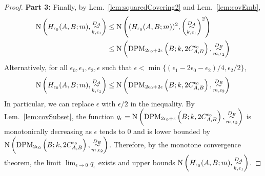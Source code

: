 \documentclass{article} %
\newcommand{\Cov}{\textnormal{N}}
\begin{document}
\begin{proof}
\textbf{Part 3:} Finally, by Lem.~\ref{lem:squaredCovering2} and Lem.~\ref{lem:covEmb}, 
\begin{equation}
\begin{aligned}
\Cov\left(H_{\epsilon_0}(A,B;m),\overset{D_A}{\underset{k,\epsilon_1}{\sim}}\right) & \leq \Cov\left((H_{\epsilon_0}(A,B;m))^2,\left(\overset{D_A}{\underset{k,\epsilon_1}{\sim}}\right)^2 \right) \\
&\leq \Cov\left (\textnormal{DPM}_{2\epsilon_0+2\epsilon}\left(B;k, 2C^{\epsilon_0}_{A,B} \right), \overset{D_B}{\underset{m,\epsilon_2}{\sim}} \right)
\end{aligned}
\end{equation}
Alternatively, for all $\epsilon_0,\epsilon_1,\epsilon_2,\epsilon$ such that $\epsilon < \min\{(\epsilon_1 - 2\epsilon_0 - \epsilon_2)/4,\epsilon_2/2\}$,
\begin{equation}
\Cov\left(H_{\epsilon_0}(A,B;m),\overset{D_A}{\underset{k,\epsilon_1}{\sim}}\right) \leq 
\Cov\left (\textnormal{DPM}_{2\epsilon_0+2\epsilon}\left(B;k, 2C^{\epsilon_0}_{A,B} \right), \overset{D_B}{\underset{m,\epsilon_2}{\sim}} \right)
\end{equation}
In particular, we can replace $\epsilon$ with $\epsilon/2$ in the inequality. By Lem.~\ref{lem:covSubset}, the function $q_\epsilon = \Cov\left (\textnormal{DPM}_{2\epsilon_0+\epsilon}\left(B;k, 2C^{\epsilon_0}_{A,B} \right), \overset{D_B}{\underset{m,\epsilon_2}{\sim}} \right)$ is monotonically decreasing as $\epsilon$ tends to $0$ and is lower bounded by $\Cov\left (\textnormal{DPM}_{2\epsilon_0}\left(B;k, 2C^{\epsilon_0}_{A,B} \right), \overset{D_B}{\underset{m,\epsilon_2}{\sim}} \right)$. Therefore, by the monotone convergence theorem, the limit $\lim_{\epsilon \to 0} q_\epsilon$ exists and upper bounds $\Cov\left(H_{\epsilon_0}(A,B;m),\overset{D_A}{\underset{k,\epsilon_1}{\sim}}\right)$.
\end{proof}


\counting* 
\end{document}
